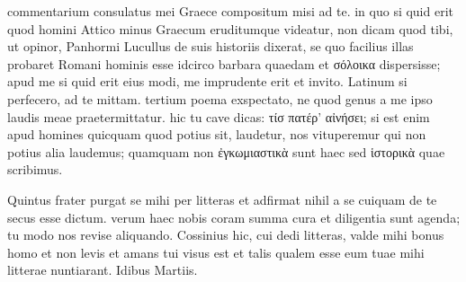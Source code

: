  commentarium consulatus mei Graece compositum misi ad te. in quo si quid erit quod homini Attico minus Graecum eruditumque videatur, non dicam quod tibi, ut opinor, Panhormi Lucullus de suis historiis dixerat, se quo facilius illas probaret Romani hominis esse idcirco barbara quaedam et σόλοικα dispersisse; apud me si quid erit eius modi, me imprudente erit et invito. Latinum si perfecero, ad te mittam. tertium poema exspectato, ne quod genus a me ipso laudis meae praetermittatur. hic tu cave dicas: τίσ πατέρ' αἰνήσει; si est enim apud homines quicquam quod potius sit, laudetur, nos vituperemur qui non potius alia laudemus; quamquam non ἐγκωμιαστικὰ sunt haec sed ἱστορικὰ quae scribimus.

 Quintus frater purgat se mihi per litteras et adfirmat nihil a se cuiquam de te secus esse dictum. verum haec nobis coram summa cura et diligentia sunt agenda; tu modo nos revise aliquando. Cossinius hic, cui dedi litteras, valde mihi bonus homo et non levis et amans tui visus est et talis qualem esse eum tuae mihi litterae nuntiarant. Idibus Martiis.
